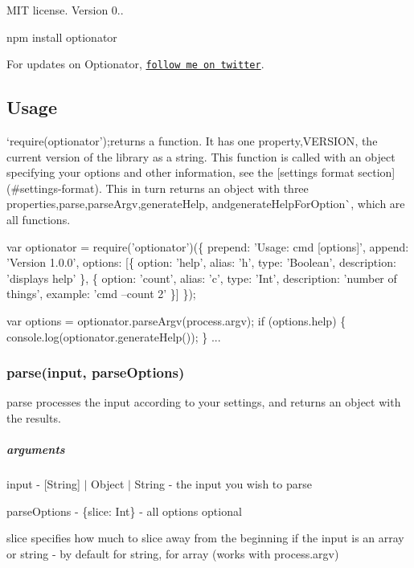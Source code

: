 M\+IT license. Version 0.. \begin{DoxyVerb}npm install optionator
\end{DoxyVerb}


For updates on Optionator, \href{https://twitter.com/gkzahariev}{\tt follow me on twitter}.

\subsection*{Usage}

`require(\textquotesingle{}optionator');{\ttfamily returns a function. It has one property,}V\+E\+R\+S\+I\+ON{\ttfamily , the current version of the library as a string. This function is called with an object specifying your options and other information, see the \mbox{[}settings format section\mbox{]}(\#settings-\/format). This in turn returns an object with three properties,}parse{\ttfamily ,}parse\+Argv{\ttfamily ,}generate\+Help{\ttfamily , and}generate\+Help\+For\+Option\`{}, which are all functions.


\begin{DoxyCode}
var optionator = require('optionator')(\{
    prepend: 'Usage: cmd [options]',
    append: 'Version 1.0.0',
    options: [\{
        option: 'help',
        alias: 'h',
        type: 'Boolean',
        description: 'displays help'
    \}, \{
        option: 'count',
        alias: 'c',
        type: 'Int',
        description: 'number of things',
        example: 'cmd --count 2'
    \}]
\});

var options = optionator.parseArgv(process.argv);
if (options.help) \{
    console.log(optionator.generateHelp());
\}
...
\end{DoxyCode}


\subsubsection*{parse(input, parse\+Options)}

{\ttfamily parse} processes the {\ttfamily input} according to your settings, and returns an object with the results.

\subparagraph*{arguments}


\begin{DoxyItemize}
\item input -\/ {\ttfamily \mbox{[}String\mbox{]} $\vert$ Object $\vert$ String} -\/ the input you wish to parse
\item parse\+Options -\/ {\ttfamily \{slice\+: Int\}} -\/ all options optional
\begin{DoxyItemize}
\item {\ttfamily slice} specifies how much to slice away from the beginning if the input is an array or string -\/ by default {} for string, {} for array (works with {\ttfamily process.\+argv})
\end{DoxyItemize}
\end{DoxyItemize}

